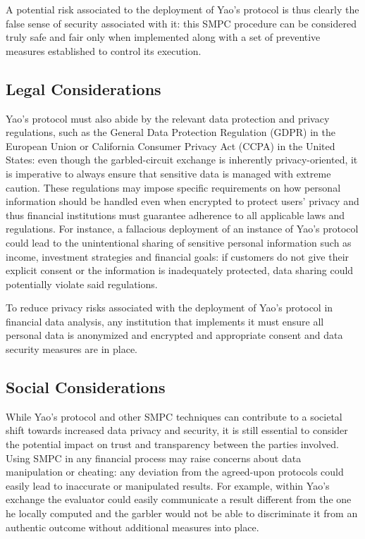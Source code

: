 \documentclass[12pt]{article}
\begin{document}
A potential risk associated to the deployment of Yao's protocol is thus clearly the false sense of security associated with it: this SMPC procedure can be considered truly safe and fair only when implemented along with a set of preventive measures established to control its execution.

\subsection{Legal Considerations}

Yao's protocol must also abide by the relevant data protection and privacy regulations, such as the General Data Protection Regulation (GDPR) in the European Union or California Consumer Privacy Act (CCPA) in the United States: even though the garbled-circuit exchange is inherently privacy-oriented, it is imperative to always ensure that sensitive data is managed with extreme caution. These regulations may impose specific requirements on how personal information should be handled even when encrypted to protect users' privacy and thus financial institutions must guarantee adherence to all applicable laws and regulations. For instance, a fallacious deployment of an instance of Yao's protocol could lead to the unintentional sharing of sensitive personal information such as income, investment strategies and financial goals: if customers do not give their explicit consent or the information is inadequately protected, data sharing could potentially violate said regulations.

To reduce privacy risks associated with the deployment of Yao's protocol in financial data analysis, any institution that implements it must ensure all personal data is anonymized and encrypted and appropriate consent and data security measures are in place.

\subsection{Social Considerations}

While Yao's protocol and other SMPC techniques can contribute to a societal shift towards increased data privacy and security, it is still essential to consider the potential impact on trust and transparency between the parties involved. Using SMPC in any financial process may raise concerns about data manipulation or cheating: any deviation from the agreed-upon protocols could easily lead to inaccurate or manipulated results. For example, within Yao's exchange the evaluator could easily communicate a result different from the one he locally computed and the garbler would not be able to discriminate it from an authentic outcome without additional measures into place. 
\end{document}
